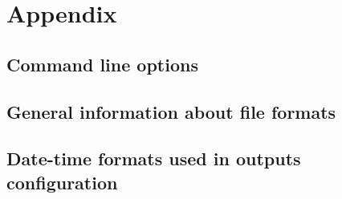 \chapter{Appendix}


\section{Command line options}

\section{General information about file formats}

\section{Date-time formats used in outputs configuration}

